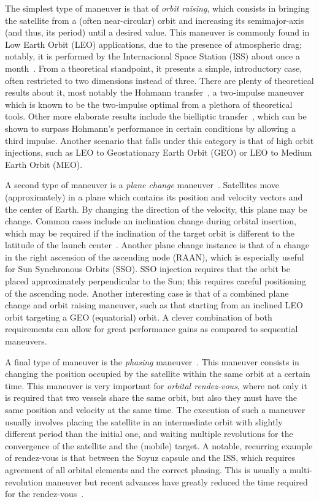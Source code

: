 The simplest type of maneuver is that of \textit{orbit raising}, which consists in bringing the satellite from a (often near-circular) orbit and increasing its semimajor-axis (and thus, its period) until a desired value. This maneuver is commonly found in Low Earth Orbit (LEO) applications, due to the presence of atmospheric drag; notably, it is performed by the Internacional Space Station (ISS) about once a month~\cite{iss_reboost}\@. From a theoretical standpoint, it presents a simple, introductory case, often restricted to two dimensions instead of three. There are plenty of theoretical results about it, most notably the Hohmann transfer~\cite{chobotov}, a two-impulse maneuver which is known to be the two-impulse optimal from a plethora of theoretical tools. Other more elaborate results include the bielliptic transfer~\cite{chobotov}, which can be shown to surpass Hohmann's performance in certain conditions by allowing a third impulse. Another scenario that falls under this category is that of high orbit injections, such as LEO to Geostationary Earth Orbit (GEO) or LEO to Medium Earth Orbit (MEO). 

A second type of maneuver is a \textit{plane change} maneuver~\cite{curtis2015orbital}. Satellites move (approximately) in a plane which contains its position and velocity vectors and the center of Earth. By changing the direction of the velocity, this plane may be change. Common cases include an inclination change during orbital insertion, which may be required if the inclination of the target orbit is different to the latitude of the launch center~\cite{curtis2015orbital}. Another plane change instance is that of a change in the right ascension of the ascending node (RAAN), which is especially useful for Sun Synchronous Orbits (SSO). SSO injection requires that the orbit be placed approximately perpendicular to the Sun; this requires careful positioning of the ascending node. Another interesting case is that of a combined plane change and orbit raising maneuver, such as that starting from an inclined LEO orbit targeting a GEO (equatorial) orbit. A clever combination of both requirements can allow for great performance gains as compared to sequential maneuvers.

A final type of maneuver is the \textit{phasing} maneuver~\cite{curtis2015orbital}. This maneuver consists in changing the position occupied by the satellite within the same orbit at a certain  time. This maneuver is very important for \textit{orbital rendez-vous}, where not only it is required that two vessels share the same orbit, but also they must have the same position and velocity at the same time. The execution of such a maneuver usually involves placing the satellite in an intermediate orbit with slightly different period than the initial one, and waiting multiple revolutions for the convergence of the satellite and the (mobile) target. A notable, recurring example of rendez-vous is that between the Soyuz capsule and the ISS, which requires agreement of all orbital elements and the correct phasing. This is usually a multi-revolution maneuver but recent advances have greatly reduced the time required for the rendez-vous~\cite{soyuz_iss}.

